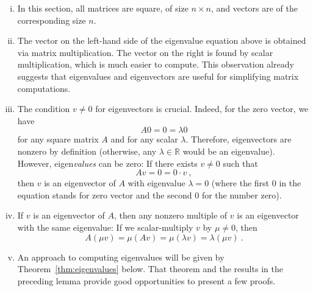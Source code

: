 \begin{remark}
\label{rem:ev}
\begin{enumerate}[(i)]
	\item In this section, all matrices are square, of size $n \times n$, and vectors are of the corresponding size $n$. 
	\item The vector on the left-hand side of the eigenvalue equation above is obtained via matrix multiplication. The vector on the right is found by scalar multiplication, which is much easier to compute. This observation already suggests that eigenvalues and eigenvectors are useful for simplifying matrix computations.
	\item The condition $v\not=0$ for eigenvectors is crucial. Indeed, for the zero vector, we have
	\[ A0 = 0 =\lambda 0 \]
	for any square matrix $A$ and for any scalar $\lambda$. Therefore, eigenvectors are nonzero by definition (otherwise, any $\lambda\in\mathbb{R}$ would be an eigenvalue). However, eigen\emph{values} can be zero: If there exists $v\not=0$ such that
	\[ Av= 0 = 0 \cdot v \:, \]
	then $v$ is an eigenvector of $A$ with eigenvalue $\lambda=0$ (where the first $0$ in the equation stands for zero vector and the second $0$ for the number zero).
	\item If $v$ is an eigenvector of $A$, then any nonzero multiple of $v$ is an eigenvector with the same eigenvalue: If we scalar-multiply $v$ by $\mu\not=0$, then
	\[ A(\mu v) = \mu (Av) = \mu (\lambda v) = \lambda (\mu v) \:. \]
	\item An approach to computing eigenvalues will be given by Theorem~\ref{thm:eigenvalues} below. That theorem and the results in the preceding lemma provide good opportunities to present a few proofs.
\end{enumerate}
\end{remark}

